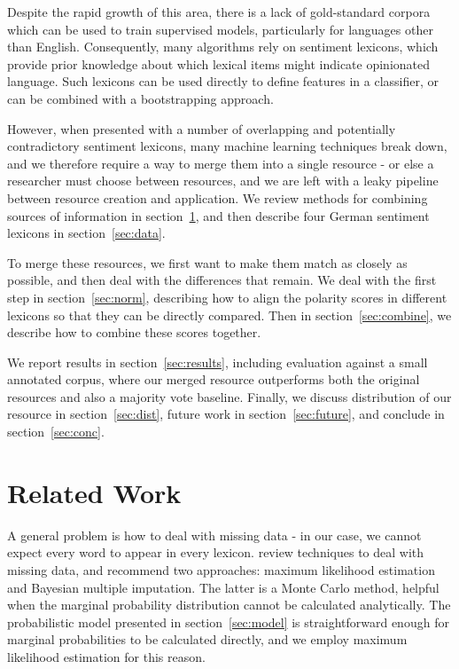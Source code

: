 \documentclass[11pt]{article}
\begin{document}
Despite the rapid growth of this area, there is a lack of gold-standard corpora which can be used to train supervised models, particularly for languages other than English.  Consequently, many algorithms rely on sentiment lexicons, which provide prior knowledge about which lexical items might indicate opinionated language.  Such lexicons can be used directly to define features in a classifier, or can be combined with a bootstrapping approach.

However, when presented with a number of overlapping and potentially contradictory sentiment lexicons, many machine learning techniques break down, and we therefore require a way to merge them into a single resource - or else a researcher must choose between resources, and we are left with a leaky pipeline between resource creation and application.  We review methods for combining sources of information in section~\ref{sec:rel}, and then describe four German sentiment lexicons in section~\ref{sec:data}.

To merge these resources, we first want to make them match as closely as possible, and then deal with the differences that remain.  We deal with the first step in section~\ref{sec:norm}, describing how to align the polarity scores in different lexicons so that they can be directly compared.  Then in section~\ref{sec:combine}, we describe how to combine these scores together.

We report results in section~\ref{sec:results}, including evaluation against a small annotated corpus, where our merged resource outperforms both the original resources and also a majority vote baseline.  Finally, we discuss distribution of our resource in section~\ref{sec:dist}, future work in section~\ref{sec:future}, and conclude in section~\ref{sec:conc}.


\section{Related Work} \label{sec:rel}

A general problem is how to deal with missing data - in our case, we cannot expect every word to appear in every lexicon.   review techniques to deal with missing data, and recommend two approaches: maximum likelihood estimation and Bayesian multiple imputation. The latter is a Monte Carlo method, helpful when the marginal probability distribution cannot be calculated analytically. The probabilistic model presented in section~\ref{sec:model} is straightforward enough for marginal probabilities to be calculated directly, and we employ maximum likelihood estimation for this reason.
\end{document}
